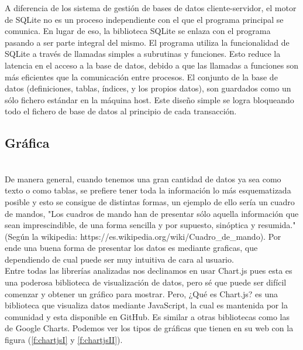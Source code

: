 \documentclass[a4paper, 11pt]{article}
\begin{document}
\begin{itemize}
            A diferencia de los sistema de gestión de bases de datos cliente-servidor,
            el motor de SQLite no es un proceso independiente con el que el programa
            principal se comunica. En lugar de eso, la biblioteca SQLite se enlaza con
            el programa pasando a ser parte integral del mismo. El programa utiliza la
            funcionalidad de SQLite a través de llamadas simples a subrutinas y
            funciones. Esto reduce la latencia en el acceso a la base de datos, debido
            a que las llamadas a funciones son más eficientes que la comunicación entre
            procesos. El conjunto de la base de datos (definiciones, tablas, índices,
            y los propios datos), son guardados como un sólo fichero estándar en la
            máquina host. Este diseño simple se logra bloqueando todo el fichero de
            base de datos al principio de cada transacción.

        \subsection{Gráfica}\\

          De manera general, cuando tenemos una gran cantidad de datos ya sea
          como texto o como tablas, se prefiere tener toda la información lo
          más esquematizada posible y esto se consigue de distintas formas, un
          ejemplo de ello sería un cuadro de mandos, "Los cuadros de mando han
          de presentar sólo aquella información que sean imprescindible, de una
          forma sencilla y por supuesto, sinóptica y resumida." (Según la
          wikipedia: https://es.wikipedia.org/wiki/Cuadro\_de\_mando). Por ende
          una buena forma de presentar los datos es mediante graficas, que
          dependiendo de cual puede ser muy intuitiva de cara al usuario.\\

          Entre todas las librerías analizadas nos declinamos en usar Chart.js
          pues esta es una poderosa biblioteca de visualización de datos, pero
          sé que puede ser difícil comenzar y obtener un gráfico para mostrar.
          Pero, ¿Qué es Chart.js? es una biblioteca que visualiza datos mediante
          JavaScript, la cual es mantenida por la comunidad y esta disponible
          en GitHub. Es similar a otras bibliotecas como las de Google Charts.
          Podemos ver los tipos de gráficas que tienen en su web con la figura
          (\ref{f:chartjsI} y \ref{f:chartjsII}).\\


\end{itemize}
\end{document}
